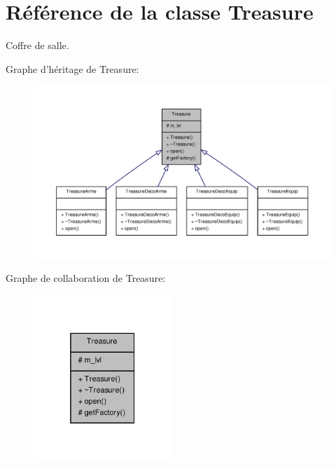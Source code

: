 \hypertarget{class_treasure}{\section{Référence de la classe Treasure}
\label{class_treasure}
}


Coffre de salle.  




Graphe d'héritage de Treasure\-:
\nopagebreak
\begin{figure}[H]
\begin{center}
\leavevmode
\includegraphics[width=350pt]{class_treasure__inherit__graph}
\end{center}
\end{figure}


Graphe de collaboration de Treasure\-:
\nopagebreak
\begin{figure}[H]
\begin{center}
\leavevmode
\includegraphics[width=148pt]{class_treasure__coll__graph}
\end{center}
\end{figure}
